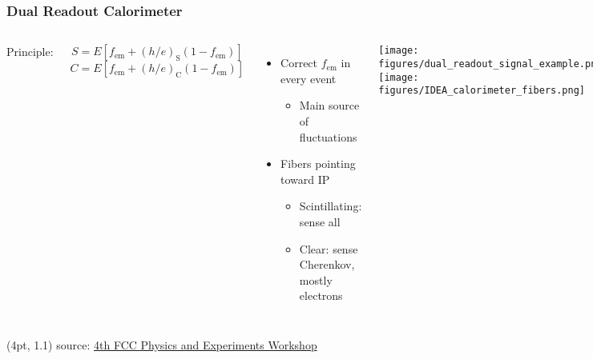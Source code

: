 \documentclass[aspectratio=169]{beamer}
\newcommand{\bluetext}[1]{%
  \textcolor{myBlue}{#1}
}
\begin{document}
\begin{frame}
  \frametitle{Dual Readout Calorimeter}

  \begin{columns}[c]
    \bluetext{Principle:}
    \[ S = E \left[ f_\text{em} + {(h/e)}_\text{S} (1 - f_\text{em}) \right] \]
    \[ C = E \left[ f_\text{em} + {(h/e)}_\text{C} (1 - f_\text{em}) \right] \]

    \begin{itemize}
      \item Correct $f_\text{em}$ in every event
            \begin{itemize}
              \item Main source of fluctuations
            \end{itemize}
      \item Fibers pointing toward IP
            \begin{itemize}
              \item \bluetext{Scintillating:} sense all
              \item \bluetext{Clear:} sense Cherenkov, mostly electrons
            \end{itemize}
    \end{itemize}

    \begin{center}
      \texttt{[image: figures/dual\_readout\_signal\_example.png]}
      \texttt{[image: figures/IDEA\_calorimeter\_fibers.png]}
    \end{center}
  \end{columns}

  \begin{textblock*}{\paperwidth}(4pt, 1.1\textheight)
    \tiny source:
    \href{https://indico.cern.ch/event/932973/}
         {4th FCC Physics and Experiments Workshop}
  \end{textblock*}
\end{frame}
\end{document}
